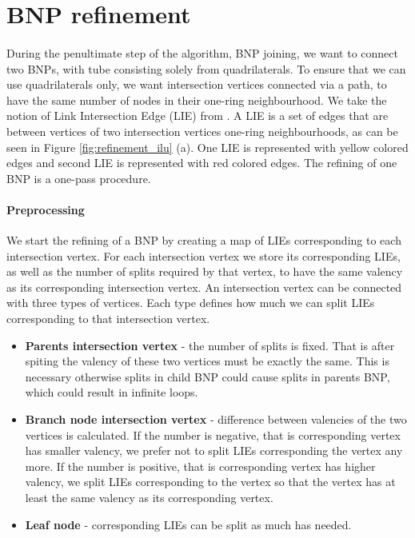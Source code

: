 \section{BNP refinement}
\paragraph{}
During the penultimate step of the algorithm, BNP joining, we want to connect two BNPs, with tube consisting solely from quadrilaterals. To ensure that we can use quadrilaterals only, we want intersection vertices connected via a path, to have the same number of nodes in their one-ring neighbourhood. We take the notion of Link Intersection Edge (LIE) from \cite{sqm}. A LIE is a set of edges that are between vertices of two intersection vertices one-ring neighbourhoods, as can be seen in Figure \ref{fig:refinement_ilu} (a). One LIE is represented with yellow colored edges and second LIE is represented with red colored edges. The refining of one BNP is a one-pass procedure.

\paragraph{Preprocessing}
We start the refining of a BNP by creating a map of LIEs corresponding to each intersection vertex. For each intersection vertex we store its corresponding LIEs, as well as the number of splits required by that vertex, to have the same valency as its corresponding intersection vertex. An intersection vertex can be connected with three types of vertices. Each type defines how much we can split LIEs corresponding to that intersection vertex.
\begin{itemize}
	\itemsep-0.25em 
	\item \textbf{Parents intersection vertex} - the number of splits is fixed. That is after spiting the valency of these two vertices must be exactly the same. This is necessary otherwise splits in child BNP could cause splits in parents BNP, which could result in infinite loops.
	\item \textbf{Branch node intersection vertex} - difference between valencies of the two vertices is calculated. If the number is negative, that is corresponding vertex has smaller valency, we prefer not to split LIEs corresponding the vertex any more. If the number is positive, that is corresponding vertex has higher valency, we split LIEs corresponding to the vertex so that the vertex has at least the same valency as its corresponding vertex.
	\item \textbf{Leaf node} - corresponding LIEs can be split as much has needed.
\end{itemize}

